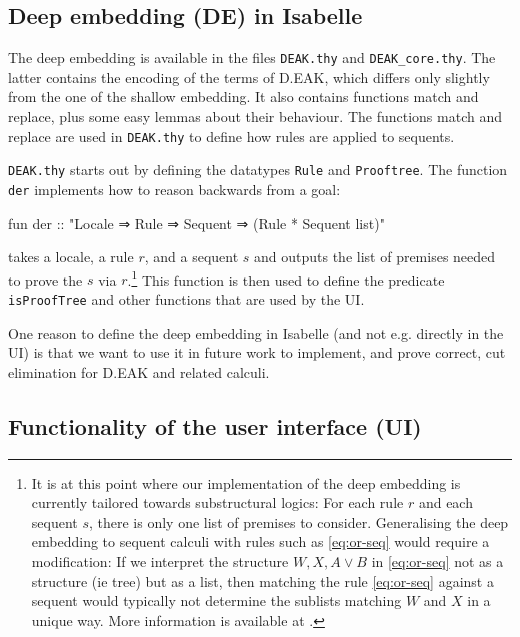 \documentclass[runningheads,a4paper]{llncs}
\begin{document}
\subsection{Deep embedding (DE) in Isabelle}

The deep embedding is available in the files \texttt{DEAK.thy} and \texttt{DEAK\_core.thy}. The latter contains the encoding of the terms of D.EAK, which differs only slightly from the one of the shallow embedding. It also contains functions match and replace, plus some easy lemmas about their behaviour. The functions match and replace are used  in \texttt{DEAK.thy} to define how rules are applied to sequents.

\texttt{DEAK.thy} starts out by defining the datatypes \texttt{Rule} and \texttt{Prooftree}. The function \texttt{der} implements how to reason backwards from a goal:
\begin{pyglist}[language=isabelle]
fun der :: "Locale ⇒ Rule ⇒ Sequent ⇒ (Rule * Sequent list)"
\end{pyglist}
\noindent takes a locale, a rule $r$, and a sequent $s$ and outputs the list of premises needed to prove the $s$ via $r$.\footnote{It is at this point where our implementation of the deep embedding is currently tailored towards substructural logics: For each rule $r$ and each sequent $s$, there is only one list of premises to consider. Generalising the deep embedding to sequent calculi with rules such as \eqref{eq:or-seq} would require a modification: If we interpret the structure $W,X,A\vee B$ in \eqref{eq:or-seq} not as a structure (ie tree) but as a list, then matching the rule \eqref{eq:or-seq} against a sequent would typically not determine the sublists matching $W$ and $X$ in a unique way. More information is available at \cite{Balco:tutorial}.} 
This function is then used to define the predicate \texttt{isProofTree} and other functions that are used by the UI.

One reason to define the deep embedding in Isabelle (and not e.g. directly in the UI) is that we want to use it in future work to implement, and prove correct, cut elimination for D.EAK and related calculi.

\subsection{Functionality of the user interface (UI)}
\end{document}
